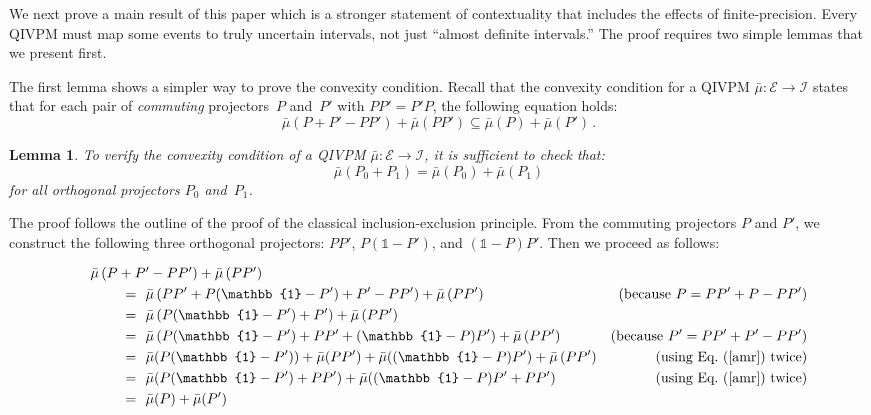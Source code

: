 \documentclass[english,reprint, aps, prl,superscriptaddress, showpacs,
showkeys, longbibliography, amsmath, amssymb, floatfix]{revtex4-1}
\theoremstyle{plain}
\newtheorem{lemma}{Lemma}
\theoremstyle{definition}
\newcommand{\events}{\ensuremath{\mathcal{E}}}
\begin{document}
We next prove a main result of this paper which is a stronger
statement of contextuality that includes the effects of
finite-precision.  Every QIVPM must map some events to truly uncertain
intervals, not just ``almost definite intervals.'' The proof requires
two simple lemmas that we present first. 

The first lemma shows a simpler way to prove the convexity
condition. Recall that the convexity condition for a QIVPM
$\bar{\mu} : \events \rightarrow \mathscr{I}$ states that for each pair of
\emph{commuting} projectors~$P$ and~$P'$ with $PP'=P'P$, the following
equation holds:
\begin{equation}
\bar{\mu}\left(P+P'-PP'\right)+\bar{\mu}\left(PP'\right)\subseteq\bar{\mu}\left(P\right)+\bar{\mu}\left(P'\right)\,.
\end{equation}

\begin{lemma}\label{lemma:verify-convexity}
  To verify the convexity condition of a QIVPM
  $\bar{\mu} : \events \rightarrow \mathscr{I}$, it is sufficient to check
  that:
\begin{equation}
\bar{\mu}\left(P_{0}+P_{1}\right)=\bar{\mu}\left(P_{0}\right)+\bar{\mu}\left(P_{1}\right)\label{amr}
\end{equation}
 for all orthogonal projectors $P_{0}$ and~$P_{1}$.
\end{lemma}
\noindent The proof follows the outline of the proof of the classical
inclusion-exclusion principle. From the commuting projectors $P$ and
$P'$, we construct the following three orthogonal projectors: $PP'$,
$P(\mathbb{1}-P')$, and $(\mathbb{1}-P)P'$. Then we proceed as
follows:
\begin{widetext}
\begin{equation*}
\begin{aligned}
\noalign{$\bar{\mu}\left(P+P'-PP'\right)+\bar{\mu}\left(PP'\right)$}
\qquad\qquad=~~&\bar{\mu}\left(PP'+P(\mathbb{1}-P')+P'-PP'\right)+\bar{\mu}\left(PP'\right) 
  & (\mbox{because } P = PP' + P - PP') \\
=~~& \bar{\mu}\left(P(\mathbb{1}-P')+P'\right)+\bar{\mu}\left(PP'\right) \\
=~~& \bar{\mu}\left(P(\mathbb{1}-P')+PP'+(\mathbb{1}-P)P'\right)+\bar{\mu}\left(PP'\right) 
      & (\mbox{because } P' = PP' + P' - PP') \\
=~~& \bar{\mu}(P(\mathbb{1}-P'))+\bar{\mu}(PP')+\bar{\mu}((\mathbb{1}-P)P')+
    \bar{\mu}\left(PP'\right) & (\mbox{using Eq.~(\ref{amr}) twice}) \\
=~~& \bar{\mu}(P(\mathbb{1}-P')+PP')+\bar{\mu}((\mathbb{1}-P)P'+PP') & (\mbox{using Eq.~(\ref{amr}) twice}) \\
=~~& \bar{\mu}(P) + \bar{\mu}(P')
\end{aligned}
\end{equation*}
\end{widetext}
\end{document}
